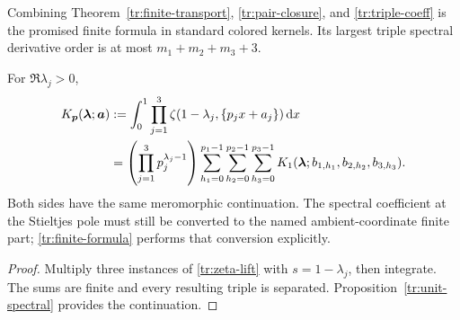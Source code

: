 Combining Theorem~\ref{tr:finite-transport},
\eqref{tr:pair-closure}, and \eqref{tr:triple-coeff} is the promised
finite formula in standard colored kernels. Its largest triple spectral
derivative order is at most $m_1+m_2+m_3+3$.

\begin{corollary}
\label{tr:spectral-lift}
For $\Re\lambda_j>0$,
\begin{align}\label{tr:Kp}
 K_{\boldsymbol p}(\boldsymbol\lambda;\boldsymbol a)
 &:=\int_0^1\prod_{j=1}^3
           \zeta(1-\lambda_j,\{p_jx+a_j\})\,\mathrm d x\notag\\
 &=\left(\prod_{j=1}^3p_j^{\lambda_j-1}\right)
   \sum_{h_1=0}^{p_1-1}\sum_{h_2=0}^{p_2-1}\sum_{h_3=0}^{p_3-1}
       K_1(\boldsymbol\lambda;b_{1,h_1},b_{2,h_2},b_{3,h_3}).
\end{align}
Both sides have the same meromorphic continuation. The spectral
coefficient at the Stieltjes pole must still be converted to the named
ambient-coordinate finite part; \eqref{tr:finite-formula} performs
that conversion explicitly.
\end{corollary}
\begin{proof}
Multiply three instances of \eqref{tr:zeta-lift} with $s=1-\lambda_j$,
then integrate. The sums are finite and every resulting triple is
separated. Proposition~\ref{tr:unit-spectral} provides the continuation.
\end{proof}

